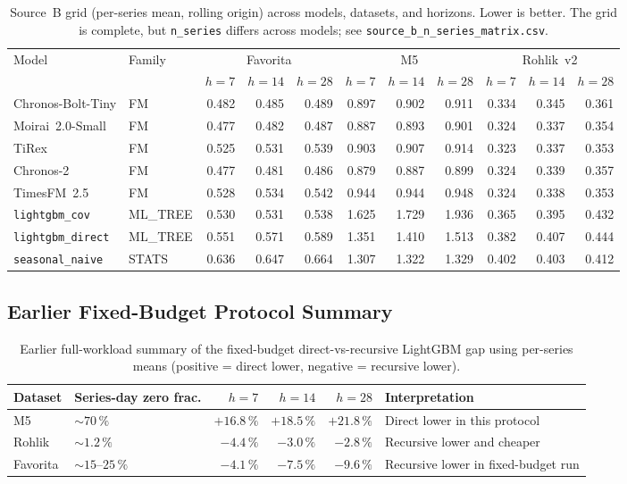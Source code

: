 \begin{table}[htbp]
\centering
\caption{Source~B \WAPE{} grid (per-series mean, rolling origin) across
models, datasets, and horizons.  Lower is better.  The grid is complete,
but \texttt{n\_series} differs across models; see
\texttt{source\_b\_n\_series\_matrix.csv}.}
\label{tab:t59}
\scriptsize
\begin{tabular}{llrrrrrrrrr}
\toprule
Model & Family & \multicolumn{3}{c}{Favorita} & \multicolumn{3}{c}{M5} & \multicolumn{3}{c}{Rohlik~v2} \\
\cmidrule(lr){3-5} \cmidrule(lr){6-8} \cmidrule(lr){9-11}
 & & $h{=}7$ & $h{=}14$ & $h{=}28$ & $h{=}7$ & $h{=}14$ & $h{=}28$ & $h{=}7$ & $h{=}14$ & $h{=}28$ \\
\midrule
Chronos-Bolt-Tiny & FM & 0.482 & 0.485 & 0.489 & 0.897 & 0.902 & 0.911 & 0.334 & 0.345 & 0.361 \\
Moirai~2.0-Small & FM & 0.477 & 0.482 & 0.487 & 0.887 & 0.893 & 0.901 & 0.324 & 0.337 & 0.354 \\
TiRex & FM & 0.525 & 0.531 & 0.539 & 0.903 & 0.907 & 0.914 & 0.323 & 0.337 & 0.353 \\
Chronos-2 & FM & 0.477 & 0.481 & 0.486 & 0.879 & 0.887 & 0.899 & 0.324 & 0.339 & 0.357 \\
TimesFM~2.5 & FM & 0.528 & 0.534 & 0.542 & 0.944 & 0.944 & 0.948 & 0.324 & 0.338 & 0.353 \\
\texttt{lightgbm\_cov} & ML\_TREE & 0.530 & 0.531 & 0.538 & 1.625 & 1.729 & 1.936 & 0.365 & 0.395 & 0.432 \\
\texttt{lightgbm\_direct} & ML\_TREE & 0.551 & 0.571 & 0.589 & 1.351 & 1.410 & 1.513 & 0.382 & 0.407 & 0.444 \\
\texttt{seasonal\_naive} & STATS & 0.636 & 0.647 & 0.664 & 1.307 & 1.322 & 1.329 & 0.402 & 0.403 & 0.412 \\
\bottomrule
\end{tabular}
\end{table}

\subsection{Earlier Fixed-Budget Protocol Summary}

\begin{table}[htbp]
\centering
\caption{Earlier full-workload summary of the fixed-budget
direct-vs-recursive LightGBM gap using per-series \WAPE{} means
(positive = direct lower, negative = recursive lower).}
\label{tab:t58-appendix}
\small
\begin{tabularx}{\textwidth}{llrrrX}
\toprule
Dataset & Series-day zero frac. & $h = 7$ & $h = 14$ & $h = 28$ & Interpretation \\
\midrule
M5 & ${\sim}70\,\%$ & $+16.8\,\%$ & $+18.5\,\%$ & $+21.8\,\%$ & Direct lower in this protocol \\
Rohlik & ${\sim}1.2\,\%$ & $-4.4\,\%$ & $-3.0\,\%$ & $-2.8\,\%$ & Recursive lower and cheaper \\
Favorita & ${\sim}15$--$25\,\%$ & $-4.1\,\%$ & $-7.5\,\%$ & $-9.6\,\%$ & Recursive lower in fixed-budget run \\
\bottomrule
\end{tabularx}
\end{table}


